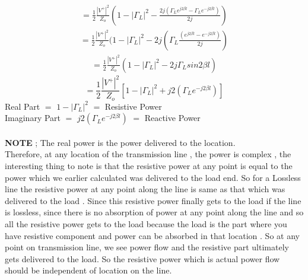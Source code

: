 \begin{align*} 
=\frac{1}{2} \frac{{ | V^+ | }^2}{Z_o} ( 1 - {|\Gamma_L}|^2 -\frac{2j(\Gamma_L e^{j2\beta l} - \Gamma_L e^{-j2\beta l})}{2j} )
\end{align*}
\begin{align*} 
=\frac{1}{2} \frac{{ | V^+ | }^2}{Z_o} ( 1 - {|\Gamma_L}|^2 -2j(\Gamma_L \frac{ ( e^{j2\beta l} - e^{-j2\beta l})}{2j}) 
\end{align*}
\begin{align*} 
=\frac{1}{2} \frac{{ | V^+ | }^2}{Z_o} ( 1 - {|\Gamma_L}|^2 -2j\Gamma_L sin2\beta l ) 
\end{align*}
\begin{equation} 
=\frac{1}{2} \frac{{ | V^+ | }^2}{Z_o}  [1 - {|\Gamma_L}|^2 + j2(\Gamma_Le^{-j2\beta l})]
\end{equation}
Real Part $=$ $1 - {|\Gamma_L}|^2$ $=$ Resistive Power\\
Imaginary Part $=$ $ j2(\Gamma_Le^{-j2\beta l})$ $=$ Reactive Power\\\\
\textbf{NOTE} ; The real power is the power delivered to the location.\\   
Therefore, at any location of the transmission line , the power is complex , the interesting thing to note is that the resistive power at any point is equal to the power which we earlier calculated was delivered to the load end. So for a Lossless line the resistive power at any point along the line is same as that which was delivered to the load . Since  this resistive power finally gets to the load if the line is lossless, since there is no absorption of power at any point along the line and so all the resistive power gets to the load because the load is the part where you have resistive component and power can be  absorbed in that location . So at any point on transmission line, we see power flow and the resistive part ultimately gets delivered to the load.  So the resistive power which is actual power flow should be independent of location on the line.

